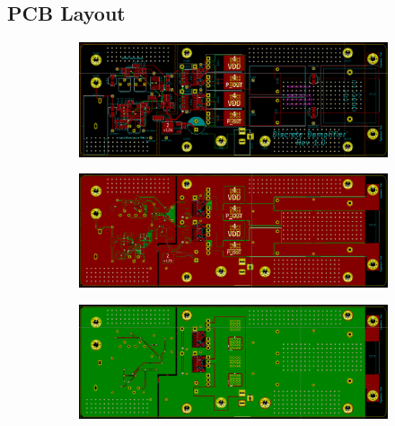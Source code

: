 \documentclass[11pt]{article}
\begin{document}
{\subsection{PCB Layout}

\begin{figure}
  \centering
  \begin{subfigure}{0.5\textwidth}
    \includegraphics[width=\columnwidth]{img/traces.png}
    \subcaption{}
  \end{subfigure}
  \begin{subfigure}{0.5\textwidth}
    \includegraphics[width=\columnwidth]{img/top_layer.png}
    \subcaption{}
  \end{subfigure}
  \begin{subfigure}{0.5\textwidth}
    \includegraphics[width=\columnwidth]{img/bottom_layer.png}
    \subcaption{}
  \end{subfigure}
  \caption{}
\end{figure}

}
\end{document}
